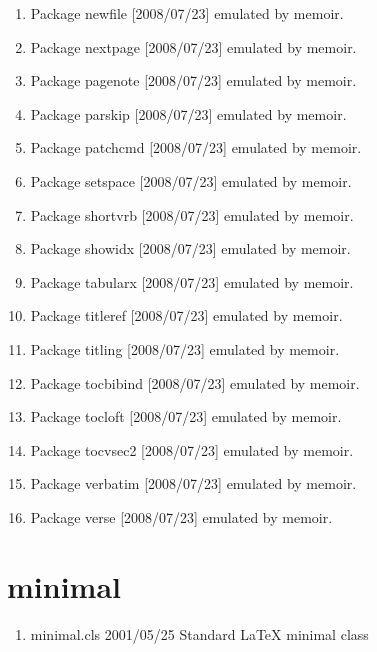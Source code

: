 \begin{enumerate}
\item 	Package newfile [2008/07/23] emulated by memoir.
\item 	Package nextpage [2008/07/23] emulated by memoir.
\item 	Package pagenote [2008/07/23] emulated by memoir.
\item 	Package parskip [2008/07/23] emulated by memoir.
\item 	Package patchcmd [2008/07/23] emulated by memoir.
\item 	Package setspace [2008/07/23] emulated by memoir.
\item 	Package shortvrb [2008/07/23] emulated by memoir.
\item 	Package showidx [2008/07/23] emulated by memoir.
\item 	Package tabularx [2008/07/23] emulated by memoir.
\item 	Package titleref [2008/07/23] emulated by memoir.
\item 	Package titling [2008/07/23] emulated by memoir.
\item 	Package tocbibind [2008/07/23] emulated by memoir.
\item 	Package tocloft [2008/07/23] emulated by memoir.
\item 	Package tocvsec2 [2008/07/23] emulated by memoir.
\item 	Package verbatim [2008/07/23] emulated by memoir.
\item 	Package verse [2008/07/23] emulated by memoir.
\end{enumerate}
\section{minimal}

\begin{enumerate}
\item minimal.cls 2001/05/25 Standard LaTeX minimal class
\end{enumerate}
